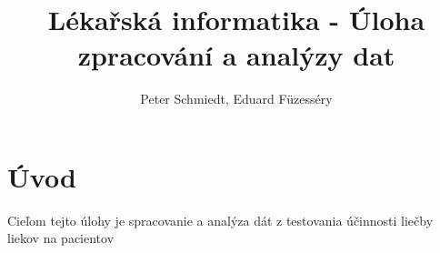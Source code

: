 \documentclass[11pt, a4paper]{article}
\author{Peter Schmiedt, Eduard Füzesséry}
\title{Lékařská informatika - Úloha zpracování a analýzy dat}
\begin{document}
\begin{titlepage}
	\maketitle
\end{titlepage}



\section{Úvod}
Cieľom tejto úlohy je spracovanie a analýza dát z testovania účinnosti liečby liekov na pacientov


\end{document}
